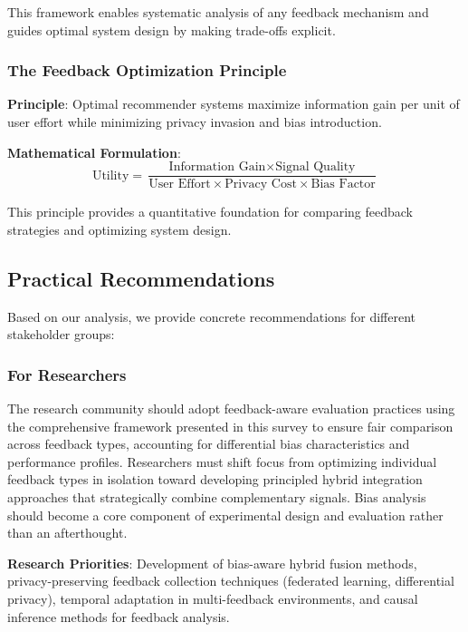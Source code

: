 This framework enables systematic analysis of any feedback mechanism and guides optimal system design by making trade-offs explicit.

\subsubsection{The Feedback Optimization Principle}
\textbf{Principle}: Optimal recommender systems maximize information gain per unit of user effort while minimizing privacy invasion and bias introduction.

\textbf{Mathematical Formulation}:
\begin{equation}
\text{Utility} = \frac{\text{Information Gain} \times \text{Signal Quality}}{\text{User Effort} \times \text{Privacy Cost} \times \text{Bias Factor}}
\end{equation}

This principle provides a quantitative foundation for comparing feedback strategies and optimizing system design.

\subsection{Practical Recommendations}

Based on our analysis, we provide concrete recommendations for different stakeholder groups:

\subsubsection{For Researchers}

The research community should adopt feedback-aware evaluation practices using the comprehensive framework presented in this survey to ensure fair comparison across feedback types, accounting for differential bias characteristics and performance profiles. Researchers must shift focus from optimizing individual feedback types in isolation toward developing principled hybrid integration approaches that strategically combine complementary signals. Bias analysis should become a core component of experimental design and evaluation rather than an afterthought.

\textbf{Research Priorities}: Development of bias-aware hybrid fusion methods, privacy-preserving feedback collection techniques (federated learning, differential privacy), temporal adaptation in multi-feedback environments, and causal inference methods for feedback analysis.

